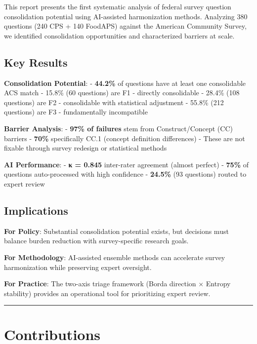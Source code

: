\documentclass[
  letterpaper,
]{report}
\begin{document}
This report presents the first systematic analysis of federal survey
question consolidation potential using AI-assisted harmonization
methods. Analyzing 380 questions (240 CPS + 140 FoodAPS) against the
American Community Survey, we identified consolidation opportunities and
characterized barriers at scale.

\subsection{Key Results}\label{key-results-1}

\textbf{Consolidation Potential}: - \textbf{44.2\%} of questions have at
least one consolidable ACS match - 15.8\% (60 questions) are F1 -
directly consolidable - 28.4\% (108 questions) are F2 - consolidable
with statistical adjustment - 55.8\% (212 questions) are F3 -
fundamentally incompatible

\textbf{Barrier Analysis}: - \textbf{97\% of failures} stem from
Construct/Concept (CC) barriers - \textbf{70\%} specifically CC.1
(concept definition differences) - These are not fixable through survey
redesign or statistical methods

\textbf{AI Performance}: - \textbf{κ = 0.845} inter-rater agreement
(almost perfect) - \textbf{75\%} of questions auto-processed with high
confidence - \textbf{24.5\%} (93 questions) routed to expert review

\subsection{Implications}\label{implications-1}

\textbf{For Policy}: Substantial consolidation potential exists, but
decisions must balance burden reduction with survey-specific research
goals.

\textbf{For Methodology}: AI-assisted ensemble methods can accelerate
survey harmonization while preserving expert oversight.

\textbf{For Practice}: The two-axis triage framework (Borda direction ×
Entropy stability) provides an operational tool for prioritizing expert
review.

\begin{center}\rule{0.5\linewidth}{0.5pt}\end{center}

\section{Contributions}\label{contributions}
\end{document}
